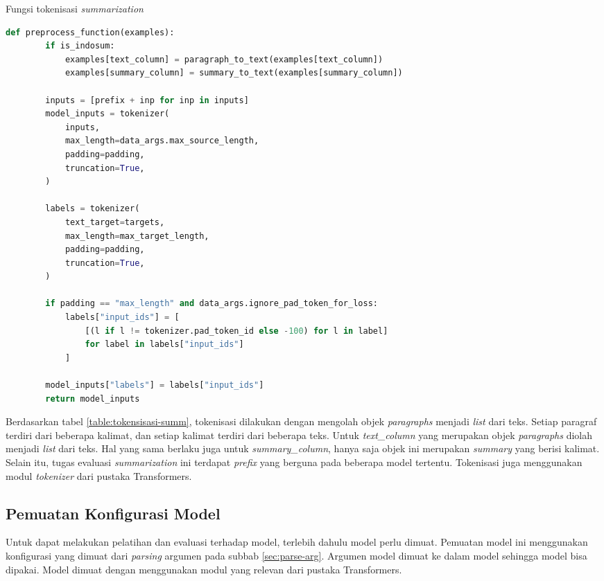\begin{table}[h]
    \caption{Fungsi tokenisasi \textit{summarization}}
    \label{table:tokensisasi-summ}
    \begin{lstlisting}[language=python]
    def preprocess_function(examples):
        if is_indosum:
            examples[text_column] = paragraph_to_text(examples[text_column])
            examples[summary_column] = summary_to_text(examples[summary_column])

        inputs = [prefix + inp for inp in inputs]
        model_inputs = tokenizer(
            inputs,
            max_length=data_args.max_source_length,
            padding=padding,
            truncation=True,
        )

        labels = tokenizer(
            text_target=targets,
            max_length=max_target_length,
            padding=padding,
            truncation=True,
        )

        if padding == "max_length" and data_args.ignore_pad_token_for_loss:
            labels["input_ids"] = [
                [(l if l != tokenizer.pad_token_id else -100) for l in label]
                for label in labels["input_ids"]
            ]

        model_inputs["labels"] = labels["input_ids"]
        return model_inputs
    \end{lstlisting}
\end{table}

Berdasarkan tabel \ref{table:tokensisasi-summ}, tokenisasi dilakukan dengan mengolah objek \textit{paragraphs} menjadi \textit{list} dari teks. Setiap paragraf terdiri dari beberapa kalimat, dan setiap kalimat terdiri dari beberapa teks. Untuk \textit{text\_column} yang merupakan objek \textit{paragraphs}  diolah menjadi \textit{list} dari teks. Hal yang sama berlaku juga untuk \textit{summary\_column}, hanya saja objek ini merupakan \textit{summary} yang berisi kalimat. Selain itu, tugas evaluasi \textit{summarization} ini terdapat \textit{prefix} yang berguna pada beberapa model tertentu. Tokenisasi juga menggunakan modul \textit{tokenizer} dari pustaka Transformers.

\subsection{Pemuatan Konfigurasi Model}

Untuk dapat melakukan pelatihan dan evaluasi terhadap model, terlebih dahulu model perlu dimuat. Pemuatan model ini menggunakan konfigurasi yang dimuat dari \textit{parsing} argumen pada subbab \ref{sec:parse-arg}. Argumen model  dimuat ke dalam model sehingga model bisa dipakai. Model  dimuat dengan menggunakan modul yang relevan dari pustaka Transformers.

